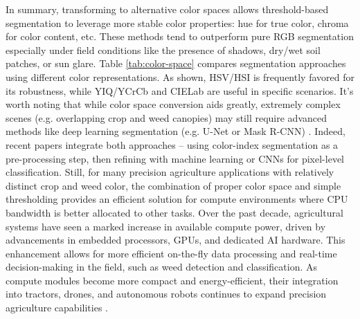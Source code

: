\documentclass[letterpaper, notitlepage]{report}
\begin{document}
%
In summary, transforming to alternative color spaces allows threshold-based segmentation to leverage more stable color properties: hue for true color, chroma for color content, etc. These methods tend to outperform pure RGB segmentation especially under field conditions like the presence of shadows, dry/wet soil patches, or sun glare. Table \ref{tab:color-space} compares segmentation approaches using different color representations. As shown, HSV/HSI is frequently favored for its robustness, while YIQ/YCrCb and CIELab are useful in specific scenarios. It’s worth noting that while color space conversion aids greatly, extremely complex scenes (e.g. overlapping crop and weed canopies) may still require advanced methods like deep learning segmentation (e.g. U-Net or Mask R-CNN) \parencite{Wu2021-gt}. Indeed, recent papers integrate both approaches – using color-index segmentation as a pre-processing step, then refining with machine learning or CNNs for pixel-level classification. Still, for many precision agriculture applications with relatively distinct crop and weed color, the combination of proper color space and simple thresholding provides an efficient solution for compute environments where CPU bandwidth is better allocated to other tasks. Over the past decade, agricultural systems have seen a marked increase in available compute power, driven by advancements in embedded processors, GPUs, and dedicated AI hardware. This enhancement allows for more efficient on-the-fly data processing and real-time decision-making in the field, such as weed detection and classification. As compute modules become more compact and energy-efficient, their integration into tractors, drones, and autonomous robots continues to expand precision agriculture capabilities \parencite{Liakos2018-ew}.
%
\end{document}

